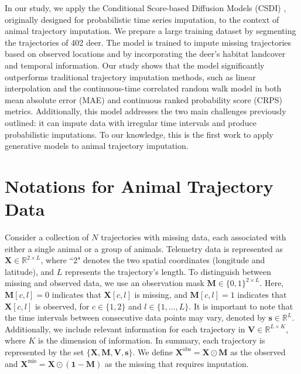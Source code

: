 \documentclass[11pt]{article}
\begin{document}
In our study, we apply the Conditional Score-based Diffusion Models (CSDI) \citep{tashiro2021csdi}, originally designed for probabilistic time series imputation, to the context of animal trajectory imputation. We prepare a large training dataset by segmenting the trajectories of 402 deer. The model is trained to impute missing trajectories based on observed locations and by incorporating the deer's habitat landcover and temporal information. Our study shows that the model significantly outperforms traditional trajectory imputation methods, such as linear interpolation and the continuous-time correlated random walk model \citep{johnson2008continuous} in both mean absolute error (MAE) and continuous ranked probability score (CRPS) metrics. Additionally, this model addresses the two main challenges previously outlined: it can impute data with irregular time intervals and produce probabilistic imputations. To our knowledge, this is the first work to apply generative models to animal trajectory imputation.

\section{Notations for Animal Trajectory Data}\label{sec: multivariate time series imputation}
Consider a collection of $N$ trajectories with missing data, each associated with either a single animal or a group of animals. Telemetry data is represented as $\bm{X} \in \mathbb{R}^{2 \times L}$, where ``2" denotes the two spatial coordinates (longitude and latitude), and $L$ represents the trajectory's length. To distinguish between missing and observed data, we use an observation mask $\bm{M} \in \{0,1\}^{2 \times L}$. Here, $\bm{M}[c,l]=0$ indicates that $\bm{X}[c,l]$ is missing, and $\bm{M}[c,l]=1$ indicates that $\bm{X}[c,l]$ is observed, for $c\in \{1,2\}$ and $l \in \{1,\ldots,L\}$. It is important to note that the time intervals between consecutive data points may vary, denoted by $\bm{s} \in \mathbb{R}^L$. Additionally, we include relevant information for each trajectory in $\bm{V} \in \mathbb{R}^{L \times K}$, where $K$ is the dimension of information. In summary, each trajectory is represented by the set $\{\bm{X}, \bm{M}, \bm{V}, \bm{s}\}$. We define $\bm{X}^{\mathrm{obs}} = \bm{X} \odot \bm{M}$ as the observed and $\bm{X}^{\mathrm{mis}} = \bm{X} \odot (\bm{1}-\bm{M})$ as the missing that requires imputation. 

\end{document}

